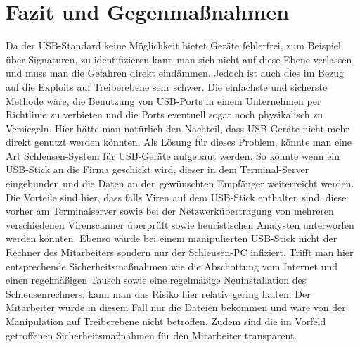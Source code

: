 \chapter{Fazit und Gegenmaßnahmen}
Da der USB-Standard keine Möglichkeit bietet Geräte fehlerfrei, zum Beispiel über Signaturen, zu identifizieren kann man sich nicht auf diese Ebene verlassen und muss man die Gefahren direkt eindämmen. Jedoch ist auch dies im Bezug auf die Exploits auf Treiberebene sehr schwer. Die einfachste und sicherste Methode wäre, die Benutzung von USB-Ports in einem Unternehmen per Richtlinie zu verbieten und die Ports eventuell sogar noch physikalisch zu Versiegeln. Hier hätte man natürlich den Nachteil, dass USB-Geräte nicht mehr direkt genutzt werden könnten. Als Lösung für dieses Problem, könnte man eine Art Schleusen-System für USB-Geräte aufgebaut werden. So könnte wenn ein USB-Stick an die Firma geschickt wird, dieser in dem Terminal-Server eingebunden und die Daten an den gewünschten Empfänger weiterreicht werden. Die Vorteile sind hier, dass falls Viren auf dem USB-Stick enthalten sind, diese vorher am Terminalserver sowie bei der Netzwerkübertragung von mehreren verschiedenen Virenscanner überprüft sowie heuristischen Analysten unterworfen werden könnten. Ebenso würde bei einem manipulierten USB-Stick nicht der Rechner des Mitarbeiters sondern nur der Schleusen-PC infiziert. Trifft man hier entsprechende Sicherheitsmaßnahmen wie die Abschottung vom Internet und einen regelmäßigen Tausch sowie eine regelmäßige Neuinstallation des Schleusenrechners, kann man das Risiko hier relativ gering halten. Der Mitarbeiter würde in diesem Fall nur die Dateien bekommen und wäre von der Manipulation auf Treiberebene nicht betroffen. Zudem sind die im Vorfeld getroffenen Sicherheitsmaßnahmen für den Mitarbeiter transparent.